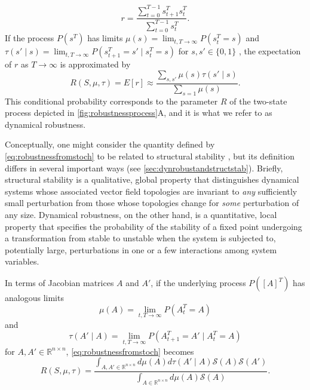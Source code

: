 $$
r = \frac{\sum_{t=0}^{T-1} s_{t+1}^T s_{t}^T}{\sum_{t=0}^{T-1} s_{t}^T}.
$$
If the process $P(s^T)$ has limits $\mu(s) = \lim_{t,T \rightarrow \infty} P(s_t^T=s)$ and $\tau(s' \mid s) = \lim_{t,T \rightarrow \infty} P(s_{t+1}^T = s' \mid s_t^T = s)$ for $s,s' \in \{0,1\}$
, the expectation of $r$ as $T \rightarrow \infty$ is approximated by
\begin{equation}\label{eq:robustnessfromstoch}
R(S,\mu,\tau) = E[r] \approx \frac{\sum_{s,s'} \mu(s) \tau(s' \mid s)}{\sum_{s=1} \mu(s)}.
\end{equation}
This conditional probability corresponds to the parameter $R$ of the two-state process depicted in \ref{fig:robustnessprocess}A, and it is what we refer to as dynamical robustness.

Conceptually, one might consider the quantity defined by \ref{eq:robustnessfromstoch} to be related to structural stability \cite{Smale1967}, but its definition differs in several important ways (see  \ref{sec:dynrobustandstructstab}). Briefly, structural stability is a qualitative, global property that distinguishes dynamical systems whose associated vector field topologies are invariant to \emph{any} sufficiently small perturbation from those whose topologies change for \emph{some} perturbation of any size. Dynamical robustness, on the other hand, is a quantitative, local property that specifies the probability of the stability of a fixed point undergoing a transformation from stable to unstable when the system is subjected to, potentially large, perturbations in one or a few interactions among system variables.

In terms of Jacobian matrices $A$ and $A'$, if the underlying process $P([A]^T)$ has analogous limits
$$\mu(A) = \lim_{t,T \rightarrow \infty} P(A_t^T=A)$$
and
$$\tau(A' \mid A) = \lim_{t,T \rightarrow \infty} P(A_{t+1}^T = A' \mid A_t^T = A)$$
for $A,A' \in \mathbb{R}^{n \times n}$, \ref{eq:robustnessfromstoch} becomes
\begin{equation}\label{eq:robustnessonjacobians}
R(S,\mu,\tau) = \frac{\int_{A,A' \in \mathbb{R}^{n \times n}} d\mu(A) d\tau(A' \mid A) \mathcal{S}(A) \mathcal{S}(A')}{\int_{A \in \mathbb{R}^{n \times n}} d\mu(A) \mathcal{S}(A)}.
\end{equation}

